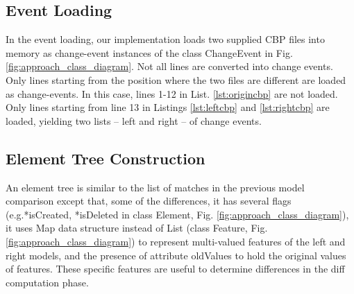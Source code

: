 \documentclass{llncs}
\begin{document}
\vspace{-20pt}
\subsection{Event Loading}
\label{sec:event_loading}
In the event loading, our implementation loads two supplied CBP files into memory as change-event instances of the class \textsf{ChangeEvent} in Fig. \ref{fig:approach_class_diagram}. Not all lines are converted into change events. Only lines starting from the position where the two files are different are loaded as change-events. In this case, lines 1-12 in List. \ref{lst:origincbp} are not loaded. Only lines starting from line 13 in Listings \ref{lst:leftcbp} and \ref{lst:rightcbp} are loaded, yielding two lists -- left and right -- of change events. 

\subsection{Element Tree Construction}
\label{sec:tree_construction}
An element tree is similar to the list of matches in the previous model comparison except that, some of the differences, it has several flags (e.g.\textsf{*isCreated}, \textsf{*isDeleted} in class \textsf{Element}, Fig. \ref{fig:approach_class_diagram}), it uses Map data structure instead of List (class \textsf{Feature}, Fig. \ref{fig:approach_class_diagram}) to represent multi-valued features of the left and right models, and the presence of attribute \textsf{oldValues} to hold the original values of features. These specific features are useful to determine differences in the diff computation phase.
\end{document}
